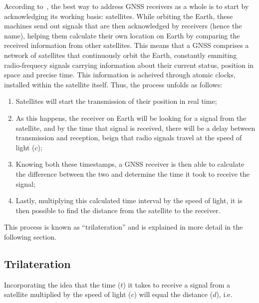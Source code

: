 According to~\cite{novatel_gnss}, the best way to address GNSS receivers as a whole is to start by acknowledging its working basis: satellites. While orbiting the Earth, these machines send out signals that are then acknowledged by receivers (hence the name), helping them calculate their own location on Earth by comparing the received information from other satellites.
This means that a GNSS comprises a network of satellites that continuously orbit the Earth, constantly emmiting radio-frequecy signals carrying information about their current status, position in space and precise time.
This information is acheived through atomic clocks, installed within the satellite itself. Thus, the process unfolds as follows:

\begin{enumerate}
    \item Satellites will start the transmission of their position in real time;
    \item As this happens, the receiver on Earth will be looking for a signal from the satellite, and by the time that signal is received, there will be a delay between transmission and reception, beign that radio signals travel at the speed of light ($c$);
    \item Knowing both these timestamps, a GNSS receiver is then able to calculate the difference between the two and determine the time it took to receive the signal;
    \item Lastly, multiplying this calculated time interval by the speed of light, it is then possible to find the distance from the satellite to the receiver.
\end{enumerate}
This process is known as ``trilateration'' and is explained in more detail in the following section.

\subsection{Trilateration}\label{sec:II_gnss_trilateration}

Incorporating the idea that the time ($t$) it takes to receive a signal from a satellite multiplied by the speed of light ($c$) will equal the distance ($d$), i.e.

